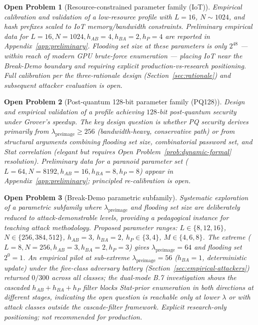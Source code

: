 \documentclass[11pt,a4paper]{article}
\newtheorem{openproblem}{Open Problem}
\begin{document}
\begin{openproblem}[Resource-constrained parameter family (IoT)]\label{prob:iot}
Empirical calibration and validation of a low-resource profile with $L = 16$, $N \sim 1024$, and hash prefixes scaled to IoT memory/bandwidth constraints. Preliminary empirical data for $L = 16, N = 1024, h_{AB} = 4, h_{BA} = 2, h_P = 4$ are reported in Appendix~\ref{app:preliminary}. Flooding set size at these parameters is only $2^{48}$ --- within reach of modern GPU brute-force enumeration --- placing IoT near the Break-Demo boundary and requiring explicit production-vs-research positioning. Full calibration per the three-rationale design (Section~\ref{sec:rationale}) and subsequent attacker evaluation is open.
\end{openproblem}

\begin{openproblem}[Post-quantum 128-bit parameter family (PQ128)]\label{prob:pq128}
Design and empirical validation of a profile achieving $128$-bit post-quantum security under Grover's speedup. The key design question is whether PQ security derives primarily from $\lambda_\text{preimage} \geq 256$ (bandwidth-heavy, conservative path) or from structural arguments combining flooding set size, combinatorial password set, and Stat correlation (elegant but requires Open Problem~\ref{prob:dynamic-formal} resolution). Preliminary data for a paranoid parameter set ($L = 64, N = 8192, h_{AB} = 16, h_{BA} = 8, h_P = 8$) appear in Appendix~\ref{app:preliminary}; principled re-calibration is open.
\end{openproblem}

\begin{openproblem}[Break-Demo parametric subfamily]\label{prob:breakdemo}
Systematic exploration of a parametric subfamily where $\lambda_\text{preimage}$ and flooding set size are deliberately reduced to attack-demonstrable levels, providing a pedagogical instance for teaching attack methodology. Proposed parameter ranges: $L \in \{8, 12, 16\}$, $N \in \{256, 384, 512\}$, $h_{AB} = 3$, $h_{BA} = 2$, $h_P \in \{3, 4\}$, $M \in \{4, 6, 8\}$. The extreme ($L = 8, N = 256, h_{AB} = 3, h_{BA} = 2, h_P = 3$) gives $\lambda_\text{preimage} = 64$ and flooding set $2^{0} = 1$. An empirical pilot at sub-extreme $\lambda_\text{preimage} = 56$ ($h_{BA} = 1$, deterministic update) under the five-class adversary battery (Section~\ref{sec:empirical-attackers}) returned $0/300$ across all classes; the dual-mode B.7 investigation shows the cascaded $h_{AB}+h_{BA}+h_P$ filter blocks Stat-prior enumeration in both directions at different stages, indicating the open question is reachable only at lower $\lambda$ or with attack classes outside the cascade-filter framework. Explicit research-only positioning; not recommended for production.
\end{openproblem}
\end{document}
